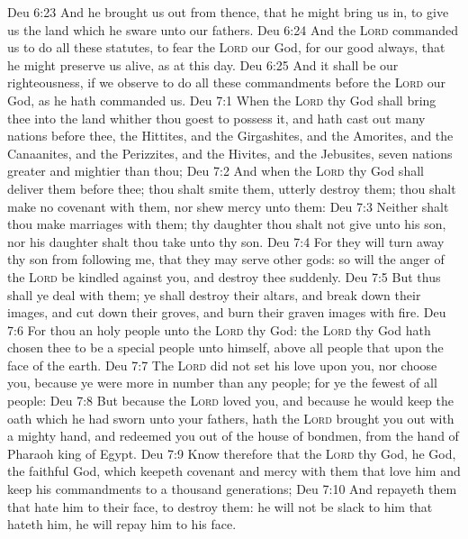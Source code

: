 \vs Deu 6:23 And he brought us out from thence, that he might bring us in, to give us the land which he sware unto our fathers.
\vs Deu 6:24 And the \textsc{Lord} commanded us to do all these statutes, to fear the \textsc{Lord} our God, for our good always, that he might preserve us alive, as  at this day.
\vs Deu 6:25 And it shall be our righteousness, if we observe to do all these commandments before the \textsc{Lord} our God, as he hath commanded us.
\vs Deu 7:1 When the \textsc{Lord} thy God shall bring thee into the land whither thou goest to possess it, and hath cast out many nations before thee, the Hittites, and the Girgashites, and the Amorites, and the Canaanites, and the Perizzites, and the Hivites, and the Jebusites, seven nations greater and mightier than thou;
\vs Deu 7:2 And when the \textsc{Lord} thy God shall deliver them before thee; thou shalt smite them,  utterly destroy them; thou shalt make no covenant with them, nor shew mercy unto them:
\vs Deu 7:3 Neither shalt thou make marriages with them; thy daughter thou shalt not give unto his son, nor his daughter shalt thou take unto thy son.
\vs Deu 7:4 For they will turn away thy son from following me, that they may serve other gods: so will the anger of the \textsc{Lord} be kindled against you, and destroy thee suddenly.
\vs Deu 7:5 But thus shall ye deal with them; ye shall destroy their altars, and break down their images, and cut down their groves, and burn their graven images with fire.
\vs Deu 7:6 For thou  an holy people unto the \textsc{Lord} thy God: the \textsc{Lord} thy God hath chosen thee to be a special people unto himself, above all people that  upon the face of the earth.
\vs Deu 7:7 The \textsc{Lord} did not set his love upon you, nor choose you, because ye were more in number than any people; for ye  the fewest of all people:
\vs Deu 7:8 But because the \textsc{Lord} loved you, and because he would keep the oath which he had sworn unto your fathers, hath the \textsc{Lord} brought you out with a mighty hand, and redeemed you out of the house of bondmen, from the hand of Pharaoh king of Egypt.
\vs Deu 7:9 Know therefore that the \textsc{Lord} thy God, he  God, the faithful God, which keepeth covenant and mercy with them that love him and keep his commandments to a thousand generations;
\vs Deu 7:10 And repayeth them that hate him to their face, to destroy them: he will not be slack to him that hateth him, he will repay him to his face.
